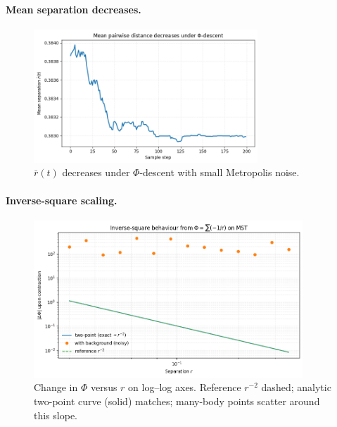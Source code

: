 \documentclass[aps,preprint,onecolumn,longbibliography,nofootinbib]{revtex4-2}
\numberwithin{equation}{section}
\begin{document}
\paragraph*{Mean separation decreases.}
\begin{figure}[H]
\centering
\includegraphics[width=0.75\textwidth]{figures/mean_distance.png}
\caption{$\bar r(t)$ decreases under $\Phi$-descent with small Metropolis noise.}
\label{fig:mean}
\end{figure}

\paragraph*{Inverse-square scaling.}
\begin{figure}[H]
\centering
\includegraphics[width=0.9\textwidth]{figures/inverse_square.png}
\caption{Change in $\Phi$ versus $r$ on log--log axes. Reference $r^{-2}$ dashed; analytic two-point curve (solid) matches; many-body points scatter around this slope.}
\label{fig:inverse}
\end{figure}
\end{document}
